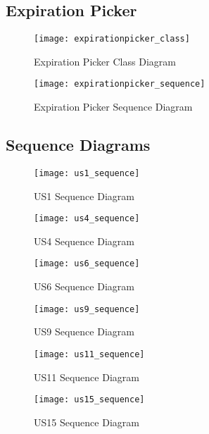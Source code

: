 \subsection{Expiration Picker}
\begin{figure}[H]
    \centering
    \texttt{[image: expirationpicker\_class]}
    \caption{Expiration Picker Class Diagram}
    \label{fig:expirationpicker_classdiagram}
\end{figure}

\begin{figure}[H]
    \centering
    \texttt{[image: expirationpicker\_sequence]}
    \caption{Expiration Picker Sequence Diagram}
    \label{fig:expirationpicker_sequence}
\end{figure}

\subsection{Sequence Diagrams}
\begin{figure}[H]
    \centering
    \texttt{[image: us1\_sequence]}
    \caption{US1 Sequence Diagram}
    \label{fig:us1_sequence}
\end{figure}

\begin{figure}[H]
    \centering
    \texttt{[image: us4\_sequence]}
    \caption{US4 Sequence Diagram}
    \label{fig:us4_sequence}
\end{figure}

\begin{figure}[H]
    \centering
    \texttt{[image: us6\_sequence]}
    \caption{US6 Sequence Diagram}
    \label{fig:us6_sequence}
\end{figure}

\begin{figure}[H]
    \centering
    \texttt{[image: us9\_sequence]}
    \caption{US9 Sequence Diagram}
    \label{fig:us9_sequence}
\end{figure}

\begin{figure}[H]
    \centering
    \texttt{[image: us11\_sequence]}
    \caption{US11 Sequence Diagram}
    \label{fig:us11_sequence}
\end{figure}

\begin{figure}[H]
    \centering
    \texttt{[image: us15\_sequence]}
    \caption{US15 Sequence Diagram}
    \label{fig:us15_sequence}
\end{figure}
